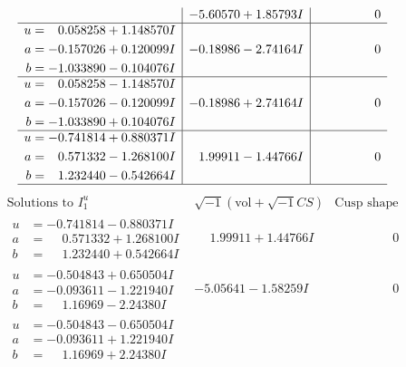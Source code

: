 \documentclass[1p]{elsarticle_modified}
\theoremstyle{definition}
\newcommand{\I}{\sqrt{-1}}
\begin{document}
$$\begin{array}{c|c|c}
 & -5.60570 + 1.85793 I & \phantom{-0.000000 } 0 \\ \hline\begin{aligned}
u &= \phantom{-}0.058258 + 1.148570 I \\
a &= -0.157026 + 0.120099 I \\
b &= -1.033890 - 0.104076 I\end{aligned}
 & -0.18986 - 2.74164 I & \phantom{-0.000000 } 0 \\ \hline\begin{aligned}
u &= \phantom{-}0.058258 - 1.148570 I \\
a &= -0.157026 - 0.120099 I \\
b &= -1.033890 + 0.104076 I\end{aligned}
 & -0.18986 + 2.74164 I & \phantom{-0.000000 } 0 \\ \hline\begin{aligned}
u &= -0.741814 + 0.880371 I \\
a &= \phantom{-}0.571332 - 1.268100 I \\
b &= \phantom{-}1.232440 - 0.542664 I\end{aligned}
 & \phantom{-}1.99911 - 1.44766 I & \phantom{-0.000000 } 0\\
 \hline 
 \end{array}$$\newpage$$\begin{array}{c|c|c}  
\text{Solutions to }I^u_{1}& \I (\text{vol} + \sqrt{-1}CS) & \text{Cusp shape}\\
 \hline 
\begin{aligned}
u &= -0.741814 - 0.880371 I \\
a &= \phantom{-}0.571332 + 1.268100 I \\
b &= \phantom{-}1.232440 + 0.542664 I\end{aligned}
 & \phantom{-}1.99911 + 1.44766 I & \phantom{-0.000000 } 0 \\ \hline\begin{aligned}
u &= -0.504843 + 0.650504 I \\
a &= -0.093611 - 1.221940 I \\
b &= \phantom{-}1.16969 - 2.24380 I\end{aligned}
 & -5.05641 - 1.58259 I & \phantom{-0.000000 } 0 \\ \hline\begin{aligned}
u &= -0.504843 - 0.650504 I \\
a &= -0.093611 + 1.221940 I \\
b &= \phantom{-}1.16969 + 2.24380 I\end{aligned}

\end{array}$$
\end{document}
